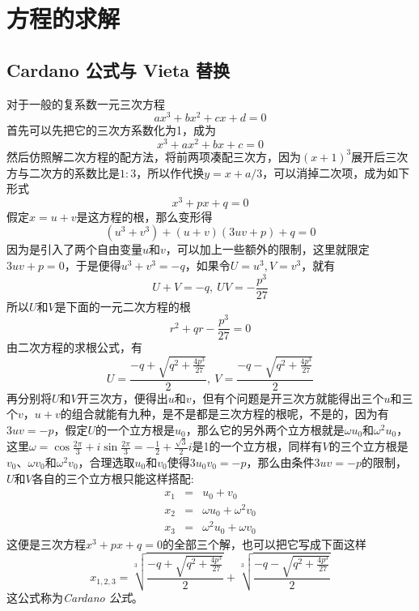 
\section{方程的求解}
\label{sec:solve-high-equation}

\subsection{Cardano 公式与 Vieta 替换}
\label{sec:solve-equation-with-3-degree}

对于一般的复系数一元三次方程
\begin{equation*}
  ax^3+bx^2+cx+d=0
\end{equation*}
首先可以先把它的三次方系数化为1，成为
\begin{equation*}
  x^3+ax^2+bx+c=0
\end{equation*}
然后仿照解二次方程的配方法，将前两项凑配三次方，因为$(x+1)^3$展开后三次方与二次方的系数比是$1:3$，所以作代换$y=x+a/3$，可以消掉二次项，成为如下形式
\begin{equation*}
  x^3+px+q=0
\end{equation*}
假定$x=u+v$是这方程的根，那么变形得
\begin{equation*}
  (u^3+v^3)+(u+v)(3uv+p)+q=0
\end{equation*}
因为是引入了两个自由变量$u$和$v$，可以加上一些额外的限制，这里就限定$3uv+p=0$，于是便得$u^3+v^3=-q$，如果令$U=u^3,V=v^3$，就有
\begin{equation*}
  U+V = -q, \  UV=-\frac{p^3}{27}
\end{equation*}
所以$U$和$V$是下面的一元二次方程的根
\begin{equation*}
  r^2+qr-\frac{p^3}{27} = 0
\end{equation*}
由二次方程的求根公式，有
\begin{equation*}
  U = \frac{-q+\sqrt{q^2+\frac{4p^3}{27}}}{2}, \  V = \frac{-q-\sqrt{q^2+\frac{4p^3}{27}}}{2}
\end{equation*}
再分别将$U$和$V$开三次方，便得出$u$和$v$，但有个问题是开三次方就能得出三个$u$和三个$v$，$u+v$的组合就能有九种，是不是都是三次方程的根呢，不是的，因为有$3uv=-p$，假定$U$的一个立方根是$u_0$，那么它的另外两个立方根就是$\omega u_0$和$\omega^2 u_0$，这里$\omega=\cos{\frac{2\pi}{3}}+i\sin{\frac{2\pi}{3}}=-\frac{1}{2}+\frac{\sqrt{3}}{2}i$是1的一个立方根，同样有$V$的三个立方根是$v_0$、$\omega v_0$和$\omega^2 v_0$，合理选取$u_0$和$v_0$使得$3u_0v_0=-p$，那么由条件$3uv=-p$的限制，$U$和$V$各自的三个立方根只能这样搭配:
\begin{eqnarray*}
  x_1 & = & u_0+v_0 \\
  x_2 & = & \omega u_0 + \omega^2 v_0 \\
  x_3 & = & \omega^2 u_0 + \omega v_0
\end{eqnarray*}
这便是三次方程$x^3+px+q=0$的全部三个解，也可以把它写成下面这样
\begin{equation}
  \label{eq:cardano-formula}
  x_{1,2,3} = \sqrt[3]{\frac{-q+\sqrt{q^2+\frac{4p^3}{27}}}{2}} + \sqrt[3]{\frac{-q-\sqrt{q^2+\frac{4p^3}{27}}}{2}}
\end{equation}
这公式称为\emph{Cardano 公式}。

